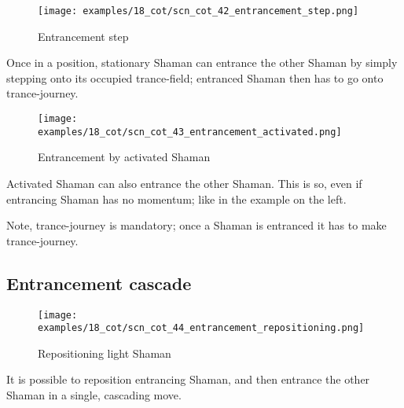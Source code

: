 \clearpage %

\noindent
\begin{wrapfigure}[6]{l}{0.4\textwidth}
\centering
\texttt{[image: examples/18\_cot/scn\_cot\_42\_entrancement\_step.png]}
\vspace*{-0.4\baselineskip}
\caption{Entrancement step}
\label{fig:scn_cot_42_entrancement_step}
\end{wrapfigure}
Once in a position, stationary Shaman can entrance the other Shaman by simply stepping
onto its occupied trance-field; entranced Shaman then has to go onto trance-journey.

\vspace*{5.1\baselineskip}

\noindent
\begin{wrapfigure}[8]{l}{0.4\textwidth}
\centering
\texttt{[image: examples/18\_cot/scn\_cot\_43\_entrancement\_activated.png]}
\vspace*{-0.4\baselineskip}
\caption{Entrancement by activated Shaman}
\label{fig:scn_cot_43_entrancement_activated}
\end{wrapfigure}
Activated Shaman can also entrance the other Shaman. This is so, even if entrancing
Shaman has no momentum; like in the example on the left.

Note, trance-journey is mandatory; once a Shaman is entranced it has to make
trance-journey.

\clearpage %

\subsection*{Entrancement cascade}
\label{sec:Conquest of Tlalocan/Trance-journey/Entrancement cascade}

\noindent
\begin{wrapfigure}[9]{l}{0.4\textwidth}
\centering
\texttt{[image: examples/18\_cot/scn\_cot\_44\_entrancement\_repositioning.png]}
\vspace*{-0.4\baselineskip}
\caption{Repositioning light Shaman}
\label{fig:scn_cot_44_entrancement_repositioning}
\end{wrapfigure}
It is possible to reposition entrancing Shaman, and then entrance the other Shaman
in a single, cascading move.

